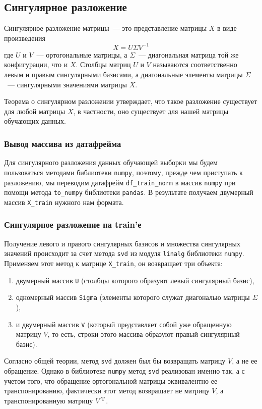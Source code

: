 \documentclass[a4paper,12pt]{article}
\begin{document}
\subsection{Сингулярное разложение}

Сингулярное разложение матрицы — это представление матрицы $X$ в виде произведения
$$
X = U\Sigma V^{-1}
$$
где $U$ и $V$ — ортогональные матрицы, а $\Sigma$ — диагональная матрица той же конфигурации, что и $X$. Столбцы матриц $U$ и $V$ называются соответственно левым и правым сингулярными базисами, а диагональные элементы матрицы $\Sigma$ — сингулярными значениями матрицы $X$.

Теорема о сингулярном разложении утверждает, что такое разложение существует для любой матрицы $X$, в частности, оно существует для нашей матрицы обучающих данных.

\subsubsection{Вывод массива из датафрейма} 

Для сингулярного разложения данных обучающей выборки мы будем пользоваться методами библиотеки \texttt{numpy}, поэтому, прежде чем приступать к разложению, мы переводим датафрейм \texttt{df\_train\_norm} в массив \texttt{numpy} при помощи метода \texttt{to\_numpy} библиотеки \texttt{pandas}. В результате получаем двумерный массив \texttt{X\_train} нужного нам формата.

\subsubsection{Сингулярное разложение на train'е} 

Получение левого и правого сингулярных базисов и множества сингулярных значений происходит за счет метода \texttt{svd} из модуля \texttt{linalg} библиотеки \texttt{numpy}. Применяем этот метод к матрице \texttt{X\_train}, он возвращает три объекта:
\medskip
\begin{enumerate}
	\item двумерный массив \texttt{U} (столбцы которого образуют левый сингулярный базис),
	\item одномерный массив \texttt{Sigma} (элементы которого служат диагональю матрицы $\Sigma$),
	\item и двумерный массив \texttt{V} (который представляет собой уже обращенную матрицу $V$, то есть, строки этого массива образуют правый сингулярный базис).
\end{enumerate}
\medskip
Согласно общей теории, метод \texttt{svd} должен был бы возвращать матрицу $V$, а не ее обращение. Однако в библиотеке \texttt{numpy} метод \texttt{svd} реализован именно так, а с учетом того, что обращение ортогональной матрицы эквивалентно ее транспонированию, фактически этот метод возвращает не матрицу $V$, а транспонированную матрицу $V^{\rm T}$.
\end{document}
